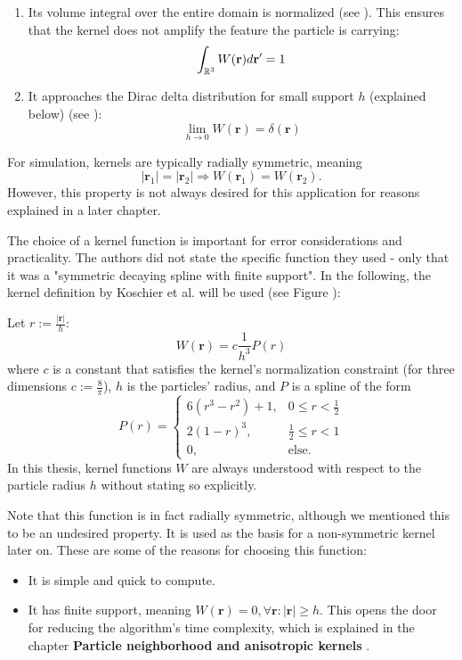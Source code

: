 \begin{enumerate}
    \item Its volume integral over the entire domain is normalized (see \cite{Monaghan:2005}). This ensures that the kernel does not amplify the feature the particle is carrying:
    \[
    \int_{\mathbb{R}^3} W(\textbf{r}) \space d \textbf{r}' = 1
    \]
    
    \item It approaches the Dirac delta distribution for small support $h$ (explained below) (see \cite{Monaghan:2005}):
    \[
    \lim\limits_{h \rightarrow 0} W(\textbf{r}) = \delta(\textbf{r})
    \]
\end{enumerate}

For simulation, kernels are typically radially symmetric, meaning
\[ |\textbf{r}_1| = |\textbf{r}_2| \Rightarrow W(\textbf{r}_1) = W(\textbf{r}_2) .\]
However, this property is not always desired for this application for reasons explained in a later chapter.

The choice of a kernel function is important for error considerations and practicality. The authors did not state the specific function they used - only that it was a "symmetric decaying spline with finite support". In the following, the kernel definition by Koschier et al. \cite{Koschier:2019} will be used (see Figure ):

Let $r := \frac{|\textbf{r}|}{h}$:
\[
W(\textbf{r}) = c \frac{1}{h^3} P(r)
\]
where $c$ is a constant that satisfies the kernel's normalization constraint (for three dimensions $c := \frac{8}{\pi}$), $h$ is the particles' radius, and $P$ is a spline of the form
\[
P(r) = \begin{cases}
  6 (r^3 - r^2) + 1 , & 0 \leq r < \frac{1}{2} \\
  2 (1 - r)^3       , & \frac{1}{2} \leq r < 1 \\
  0                 , & \text{else.}
\end{cases}
\]
In this thesis, kernel functions $W$ are always understood with respect to the particle radius $h$ without stating so explicitly.

Note that this function is in fact radially symmetric, although we mentioned this to be an undesired property. It is used as the basis for a non-symmetric kernel later on.
These are some of the reasons for choosing this function:
\begin{itemize}
    \item It is simple and quick to compute.
    \item It has finite support, meaning $W(\textbf{r}) = 0, \forall \textbf{r}: |\textbf{r}| \geq h$. This opens the door for reducing the algorithm's time complexity, which is explained in the chapter \textbf{Particle neighborhood and anisotropic kernels }.
\end{itemize}


